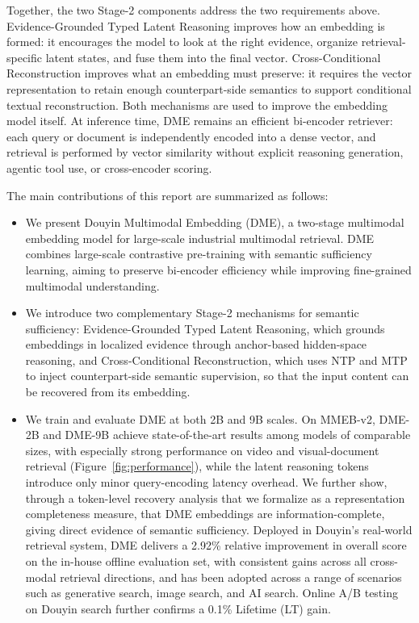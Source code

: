 Together, the two Stage-2 components address the two requirements above. Evidence-Grounded Typed Latent Reasoning improves how an embedding is formed: it encourages the model to look at the right evidence, organize retrieval-specific latent states, and fuse them into the final vector. Cross-Conditional Reconstruction improves what an embedding must preserve: it requires the vector representation to retain enough counterpart-side semantics to support conditional textual reconstruction. Both mechanisms are used to improve the embedding model itself. At inference time, DME remains an efficient bi-encoder retriever: each query or document is independently encoded into a dense vector, and retrieval is performed by vector similarity without explicit reasoning generation, agentic tool use, or cross-encoder scoring.

The main contributions of this report are summarized as follows:
\begin{itemize}
    \item We present Douyin Multimodal Embedding (DME), a two-stage multimodal embedding model for large-scale industrial multimodal retrieval. DME combines large-scale contrastive pre-training with semantic sufficiency learning, aiming to preserve bi-encoder efficiency while improving fine-grained multimodal understanding.

    \item We introduce two complementary Stage-2 mechanisms for semantic sufficiency: Evidence-Grounded Typed Latent Reasoning, which grounds embeddings in localized evidence through anchor-based hidden-space reasoning, and Cross-Conditional Reconstruction, which uses NTP and MTP to inject counterpart-side semantic supervision, so that the input content can be recovered from its embedding.

    \item We train and evaluate DME at both 2B and 9B scales. On MMEB-v2, DME-2B and DME-9B achieve state-of-the-art results among models of comparable sizes, with especially strong performance on video and visual-document retrieval (Figure~\ref{fig:performance}), while the latent reasoning tokens introduce only minor query-encoding latency overhead. We further show, through a token-level recovery analysis that we formalize as a representation completeness measure, that DME embeddings are information-complete, giving direct evidence of semantic sufficiency. Deployed in Douyin's real-world retrieval system, DME delivers a 2.92\% relative improvement in overall score on the in-house offline evaluation set, with consistent gains across all cross-modal retrieval directions, and has been adopted across a range of scenarios such as generative search, image search, and AI search. Online A/B testing on Douyin search further confirms a 0.1\% Lifetime (LT) gain.
\end{itemize}

